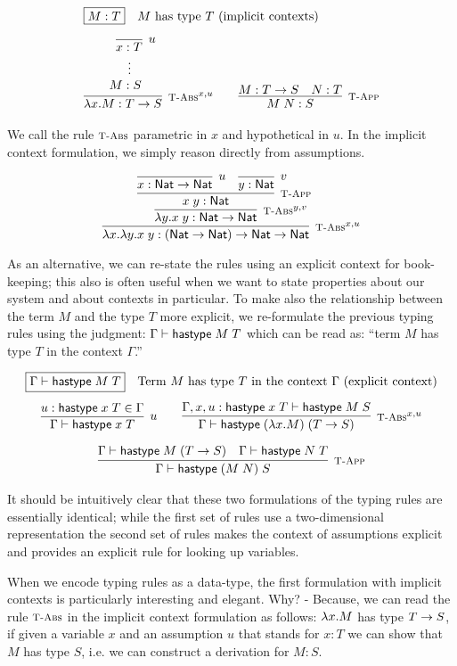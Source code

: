 \[
\begin{array}{c@{\qquad}c}
\multicolumn{2}{l}{ \fbox{$M:T$} \quad \mbox{$M$ has type $T$ (implicit contexts)}} \\[1em]
\infer[\TFn^{x,u}]{\lam x.M : T \arrow S}
                 {\hypo{\quad\infer[u]{x:T}{}}{M:S~~}} &
\infer[\TApp]{M\;N : S}{M : T \arrow S & N:T}
\end{array}
\]

We call the rule $\textsc{\footnotesize T-Abs}$ parametric in $x$ and hypothetical in $u$.
In the implicit context formulation, we simply reason directly from
assumptions.


\[
\infer[\TFn^{x,u}]{\lam x. \lam y. x \app y : (\Nat \arrow \Nat) \arrow \Nat \arrow \Nat}
{\infer[\TFn^{y,v}]{\lam y.x \app y : \Nat \arrow \Nat}{
 \infer[\TApp]{x \app y : \Nat}
   {\infer[u]{x:\Nat \arrow \Nat}{} &
    \infer[v]{y:\Nat}{}
   }
 }
}
\]

As an alternative, we can re-state the rules using an explicit context for
book-keeping; this also is often useful when we want to state properties about
our system and about contexts in particular. To make also the
relationship between the term $M$ and the type $T$ more explicit, we
re-formulate the previous typing rules using the judgment: $\Gamma
\vdash \mathsf{hastype}\;M\;T$ which can be read as: ``term $M$ has type $T$
in the context $\Gamma$.''

\[
\begin{array}{c}
\multicolumn{1}{l}{\fbox{$\Gamma \vdash \tmhastype M
    T$}\quad\mbox{Term $M$ has type $T$ in the context $\Gamma$
    (explicit context)} }
\\[1em]
\infer[u]{\Gamma \vdash \tmhastype x T}{u:\tmhastype x T \in \Gamma} \qquad
\infer[\TFn^{x,u}]{\Gamma \vdash \tmhastype {(\lam x.M)} {(T \arrow S)}}
                 {\Gamma,x, u:\tmhastype x T \vdash \tmhastype M S}
\\[1em]
\infer[\TApp]{\Gamma \vdash \tmhastype {(M \app N)} S}
             {\Gamma \vdash \tmhastype M (T \arrow S)
  & \Gamma \vdash \tmhastype N T}
\end{array}
\]

It should be intuitively clear that these two formulations of the typing rules
are essentially identical; while the first set of rules use a two-dimensional
representation the second set of rules makes the context of
assumptions explicit and provides an explicit rule for looking up variables.

When we encode typing rules as a data-type, the first formulation with implicit
contexts is particularly interesting and elegant. Why? - Because, we can read the
rule $\textsc{\footnotesize T-Abs}$ in the implicit context formulation as follows: $\lambda x.M$ has type $T \rightarrow S$, if given a variable
$x$ and an assumption $u$ that stands for $x:T$ we can show that $M$ has type
$S$, i.e. we can construct a derivation for $M:S$.

